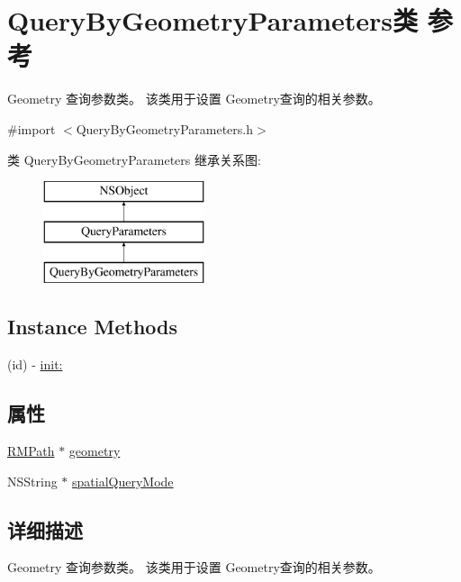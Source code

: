 \hypertarget{interface_query_by_geometry_parameters}{\section{Query\-By\-Geometry\-Parameters类 参考}
\label{interface_query_by_geometry_parameters}
}


Geometry 查询参数类。 该类用于设置 Geometry查询的相关参数。  




{\ttfamily \#import $<$Query\-By\-Geometry\-Parameters.\-h$>$}

类 Query\-By\-Geometry\-Parameters 继承关系图\-:\begin{figure}[H]
\begin{center}
\leavevmode
\includegraphics[height=3.000000cm]{interface_query_by_geometry_parameters}
\end{center}
\end{figure}
\subsection*{Instance Methods}
\begin{DoxyCompactItemize}
\item 
(id) -\/ \hyperlink{interface_query_by_geometry_parameters_a1af5a7b4aa2971a828d92bb034264b8e}{init\-:}
\end{DoxyCompactItemize}
\subsection*{属性}
\begin{DoxyCompactItemize}
\item 
\hyperlink{interface_r_m_path}{R\-M\-Path} $\ast$ \hyperlink{interface_query_by_geometry_parameters_ac10c0247460c6c4b3cb67db86958d376}{geometry}
\item 
N\-S\-String $\ast$ \hyperlink{interface_query_by_geometry_parameters_a8487decf8e4c51304266676f62cd83fa}{spatial\-Query\-Mode}
\end{DoxyCompactItemize}


\subsection{详细描述}
Geometry 查询参数类。 该类用于设置 Geometry查询的相关参数。 

